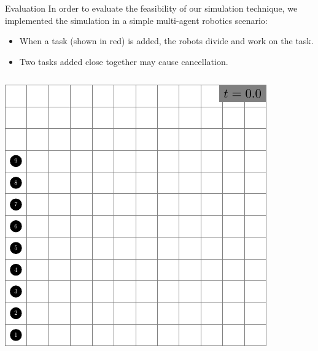 \documentclass[aspectratio=1610,mathserif]{beamer}
\begin{document}
\begin{frame}{Evaluation}
    In order to evaluate the feasibility of our simulation technique, we
    implemented the simulation in a simple multi-agent robotics scenario:

    \begin{itemize}
        \item When a task (shown in red) is added, the robots divide and work
            on the task.
        \item Two tasks added close together may cause cancellation.
    \end{itemize}

    \begin{columns}
        \begin{column}{0.33\textwidth}
            \includegraphics[width=\textwidth]{sim1.pdf}
        \end{column}
        \begin{column}{0.33\textwidth}

\end{column}
\end{columns}
\end{frame}
\end{document}
